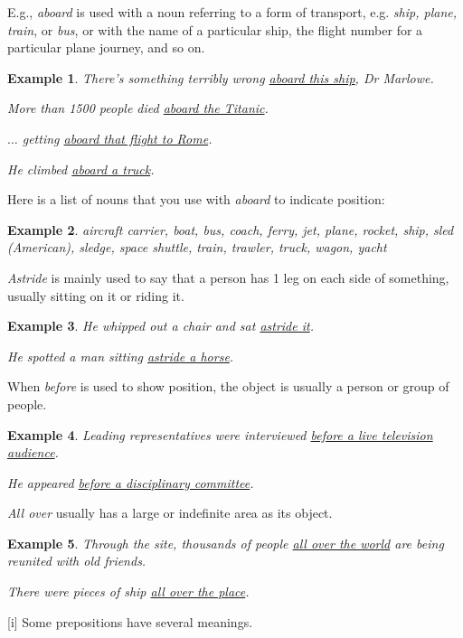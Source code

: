 \documentclass[oneside]{book}
\numberwithin{equation}{section}
\newtheorem{example}{Example}[section]
\begin{document}
%
E.g., \textit{aboard} is used with a noun referring to a form of transport, e.g. \textit{ship, plane, train}, or \textit{bus}, or with the name of a particular ship, the flight number for a particular plane journey, and so on.
\begin{example}
    There's something terribly wrong \underline{aboard this ship}, Dr Marlowe.
    
    More than 1500 people died \underline{aboard the Titanic}.
    
    $\ldots$ getting \underline{aboard that flight to Rome}.
    
    He climbed \underline{aboard a truck}.
\end{example}
Here is a list of nouns that you use with \textit{aboard} to indicate position:
\begin{example}
    aircraft carrier, boat, bus, coach, ferry, jet, plane, rocket, ship, sled \emph{(American)}, sledge, space shuttle, train, trawler, truck, wagon, yacht
\end{example}
\textit{Astride} is mainly used to say that a person has 1 leg on each side of something, usually sitting on it or riding it.
\begin{example}
    He whipped out a chair and sat \underline{astride it}.
    
    He spotted a man sitting \underline{astride a horse}.
\end{example}
When \textit{before} is used to show position, the object is usually a person or group of people.
\begin{example}
    Leading representatives were interviewed \underline{before a live television audience}.
    
    He appeared \underline{before a disciplinary committee}.
\end{example}
\textit{All over} usually has a large or indefinite area as its object.
\begin{example}
    Through the site, thousands of people \underline{all over the world} are being reunited with old friends.
    
    There were pieces of ship \underline{all over the place}.
\end{example}
%
\noindent{} [i] Some prepositions have several meanings.
\end{document}
